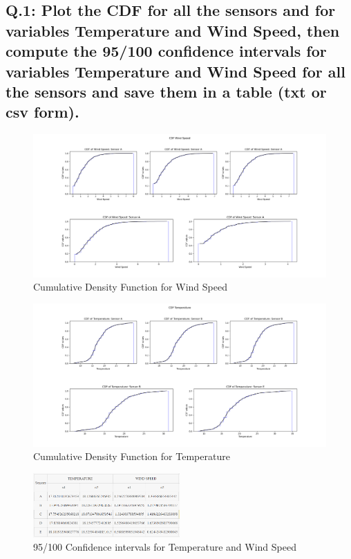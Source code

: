 \documentclass[a4paper]{article}
\begin{document}
        \subsection{Q.1: Plot the CDF for all the sensors and for variables Temperature and Wind Speed, then compute the 95/100 confidence intervals for variables Temperature and Wind Speed for all the sensors and save them in a table (txt or csv form).}
        \begin{figure}[H]
        \centering
            \includegraphics[width=\textwidth]{images/CDF_Wind_Speed_5_sensors.png}
            \caption{Cumulative Density Function for Wind Speed}
            \label{fig:CDF}
        \end{figure}
        
        \begin{figure}[H]
        \centering
            \includegraphics[width=\textwidth]{images/CDF_Temperature_5_sensors.png}
            \caption{Cumulative Density Function for Temperature}
            \label{fig:CDF}
        \end{figure}

            \begin{figure}[H]
            \centering
                \includegraphics[width=0.5\textwidth]{images/intervals.PNG}
                \caption{95/100 Confidence intervals for Temperature and Wind Speed}
                \label{fig:Confidence intervals}
            \end{figure}
\end{document}
